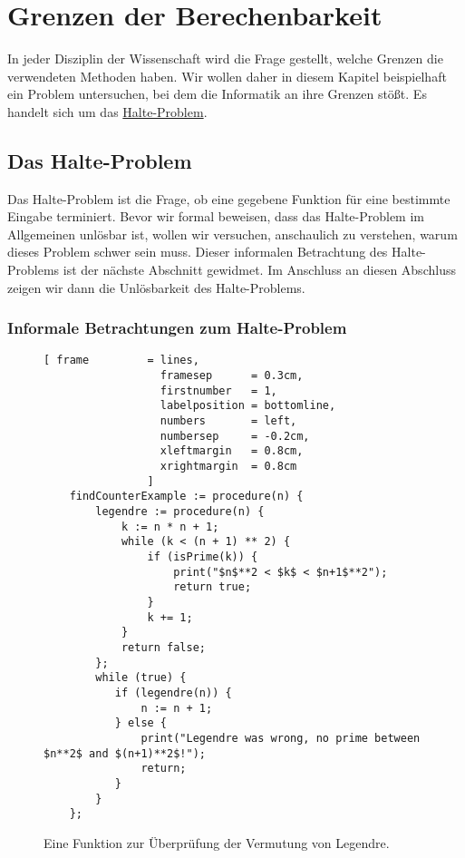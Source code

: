 \chapter{Grenzen der Berechenbarkeit}
In jeder Disziplin der Wissenschaft wird die Frage gestellt, welche Grenzen die
verwendeten Methoden haben.   Wir wollen daher in diesem Kapitel beispielhaft ein Problem
untersuchen, bei dem die Informatik an ihre Grenzen stößt.  Es handelt sich um das
\href{http://de.wikipedia.org/wiki/Halteproblem}{Halte-Problem}.  

\section{Das Halte-Problem}
Das Halte-Problem ist die Frage, ob eine gegebene Funktion für eine bestimmte Eingabe 
terminiert.  Bevor wir formal beweisen, dass das Halte-Problem im Allgemeinen unlösbar ist, wollen 
wir versuchen, anschaulich zu verstehen, warum dieses Problem schwer sein muss.  Dieser informalen
Betrachtung des Halte-Problems ist der nächste Abschnitt gewidmet.  Im Anschluss an diesen Abschluss
zeigen wir dann die Unlösbarkeit des Halte-Problems. 

\subsection{Informale Betrachtungen zum Halte-Problem}


\begin{figure}[!ht]
\centering
\begin{Verbatim}[ frame         = lines, 
                  framesep      = 0.3cm, 
                  firstnumber   = 1,
                  labelposition = bottomline,
                  numbers       = left,
                  numbersep     = -0.2cm,
                  xleftmargin   = 0.8cm,
                  xrightmargin  = 0.8cm
                ]
    findCounterExample := procedure(n) {
        legendre := procedure(n) {
            k := n * n + 1;
            while (k < (n + 1) ** 2) {
                if (isPrime(k)) {
                    print("$n$**2 < $k$ < $n+1$**2");
                    return true;
                }
                k += 1;
            }
            return false;
        };
        while (true) {
           if (legendre(n)) {
               n := n + 1;
           } else {
               print("Legendre was wrong, no prime between $n**2$ and $(n+1)**2$!");
               return;
           }
        }
    };
\end{Verbatim} 
\vspace*{-0.3cm}
\caption{Eine Funktion zur Überprüfung der Vermutung von Legendre.}
\label{fig:legendre.stlx}
\end{figure}

